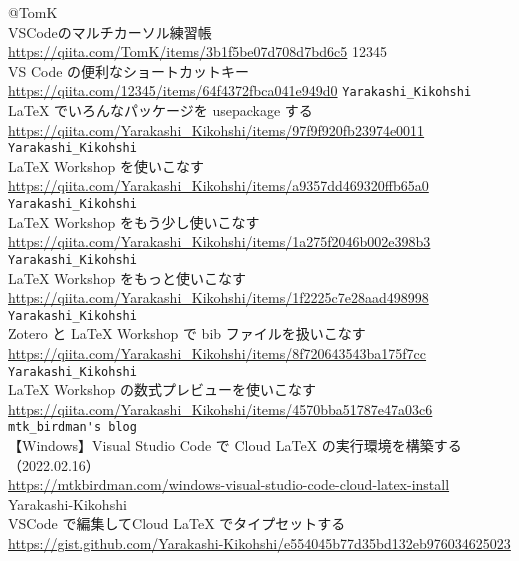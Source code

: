 \documentclass{ltjsarticle}
\begin{document}
\begin{thebibliography}{999}
  @TomK\\
  VSCodeのマルチカーソル練習帳\\
  \url{https://qiita.com/TomK/items/3b1f5be07d708d7bd6c5}
  12345\\
  VS Code の便利なショートカットキー\\
  \url{https://qiita.com/12345/items/64f4372fbca041e949d0}
  \verb|Yarakashi_Kikohshi|\\
  LaTeX でいろんなパッケージを usepackage する\\
  \url{https://qiita.com/Yarakashi_Kikohshi/items/97f9f920fb23974e0011}
  \verb|Yarakashi_Kikohshi|\\
  LaTeX Workshop を使いこなす\\
  \url{https://qiita.com/Yarakashi_Kikohshi/items/a9357dd469320ffb65a0}
  \verb|Yarakashi_Kikohshi|\\
  LaTeX Workshop をもう少し使いこなす\\
  \url{https://qiita.com/Yarakashi_Kikohshi/items/1a275f2046b002e398b3}
  \verb|Yarakashi_Kikohshi|\\
  LaTeX Workshop をもっと使いこなす\\
  \url{https://qiita.com/Yarakashi_Kikohshi/items/1f2225c7e28aad498998}
  \verb|Yarakashi_Kikohshi|\\
  Zotero と LaTeX Workshop で bib ファイルを扱いこなす\\
  \url{https://qiita.com/Yarakashi_Kikohshi/items/8f720643543ba175f7cc}
  \verb|Yarakashi_Kikohshi|\\
  LaTeX Workshop の数式プレビューを使いこなす\\
  \url{https://qiita.com/Yarakashi_Kikohshi/items/4570bba51787e47a03c6}
  \verb|mtk_birdman's blog|\\
  【Windows】Visual Studio Code で Cloud LaTeX の実行環境を構築する（2022.02.16）\\
  \url{https://mtkbirdman.com/windows-visual-studio-code-cloud-latex-install}
  Yarakashi-Kikohshi\\
  VSCode で編集してCloud LaTeX でタイプセットする\\
  \url{https://gist.github.com/Yarakashi-Kikohshi/e554045b77d35bd132eb976034625023}

  
\end{thebibliography}
\end{document}
